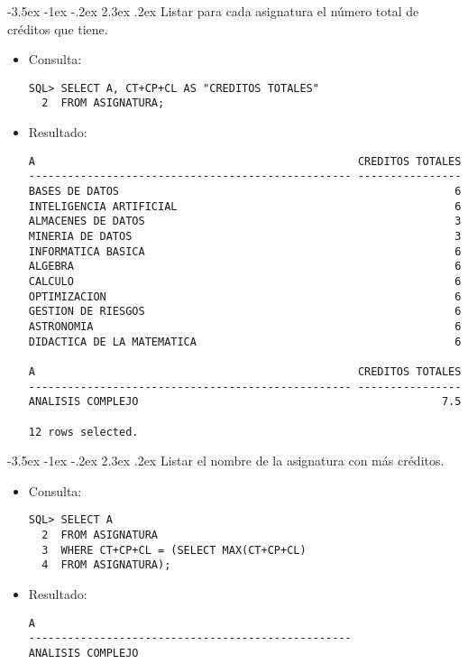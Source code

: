 \documentclass[11pt]{report}
\makeatletter
\renewcommand\chapter{\@startsection{chapter}{0}{\z@}%
    {-3.5ex \@plus -1ex \@minus -.2ex}%
    {2.3ex \@plus.2ex}%
    {\normalfont\Large\bfseries}}
\makeatother
\begin{document}
\chapter{Listar para cada asignatura el número total de créditos que tiene.}
\begin{itemize}
  \item Consulta:
  \begin{verbatim}
SQL> SELECT A, CT+CP+CL AS "CREDITOS TOTALES"
  2  FROM ASIGNATURA;
  \end{verbatim}
  \item{Resultado:}
  \begin{verbatim}
A                                                  CREDITOS TOTALES             
-------------------------------------------------- ----------------             
BASES DE DATOS                                                    6             
INTELIGENCIA ARTIFICIAL                                           6             
ALMACENES DE DATOS                                                3             
MINERIA DE DATOS                                                  3             
INFORMATICA BASICA                                                6             
ALGEBRA                                                           6             
CALCULO                                                           6             
OPTIMIZACION                                                      6             
GESTION DE RIESGOS                                                6             
ASTRONOMIA                                                        6             
DIDACTICA DE LA MATEMATICA                                        6             

A                                                  CREDITOS TOTALES             
-------------------------------------------------- ----------------             
ANALISIS COMPLEJO                                               7.5             

12 rows selected.                                                                            
  \end{verbatim}
\end{itemize}

\chapter{Listar el nombre de la asignatura con más créditos.}
\begin{itemize}
  \item Consulta:
  \begin{verbatim}
SQL> SELECT A
  2  FROM ASIGNATURA
  3  WHERE CT+CP+CL = (SELECT MAX(CT+CP+CL)
  4  FROM ASIGNATURA);
  \end{verbatim}
  \item{Resultado:}
  \begin{verbatim}
A                                                                               
--------------------------------------------------                              
ANALISIS COMPLEJO                                                                        
  \end{verbatim}
\end{itemize}
\end{document}
